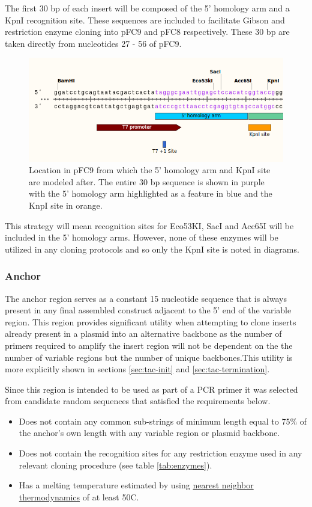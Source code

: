 \documentclass[11pt]{article}
\begin{document}
The first 30 bp of each insert will be composed of the 5' homology arm and a KpnI recognition site. These sequences are included to facilitate Gibson and restriction enzyme cloning into pFC9 and pFC8 respectively. These 30 bp are taken directly from nucleotides 27 - 56 of pFC9.

\begin{figure}[h]
	\includegraphics[width=12cm]{images/variable_region/5_homology_arm.png}
	\centering
	\caption{Location in pFC9 from which the 5' homology arm and KpnI site are modeled after. The entire 30 bp sequence is shown in purple with the 5' homology arm highlighted as a feature in blue and the KnpI site in orange.}
	\label{fig:1}
\end{figure}

This strategy will mean recognition sites for Eco53KI, SacI and Acc65I will be included in the 5' homology arms. However, none of these enzymes will be utilized in any cloning protocols and so only the KpnI site is noted in diagrams.


\subsubsection{Anchor}

The anchor region serves as a constant 15 nucleotide sequence that is always present in any final assembled construct adjacent to the 5' end of the variable region. This region provides significant utility when attempting to clone inserts already present in a plasmid into an alternative backbone as the number of primers required to amplify the insert region will not be dependent on the the number of variable regions but the number of unique backbones.This utility is more explicitly shown in sections \ref{sec:tac-init} and \ref{sec:tac-termination}. 

Since this region is intended to be used as part of a PCR primer it was selected from candidate random sequences that satisfied the requirements below.

\begin{itemize}
	\item Does not contain any common sub-strings of minimum length equal to 75\% of the anchor's own length with any variable region or plasmid backbone.
	\item Does not contain the recognition sites for any restriction enzyme used in any relevant cloning procedure (see table \ref{tab:enzymes}).
	\item Has a melting temperature estimated by using \href{https://biopython.org/docs/1.75/api/Bio.SeqUtils.MeltingTemp.html#Bio.SeqUtils.MeltingTemp.Tm_GC}{nearest neighbor thermodynamics} of at least 50\textdegree C.
\end{itemize}
\end{document}
